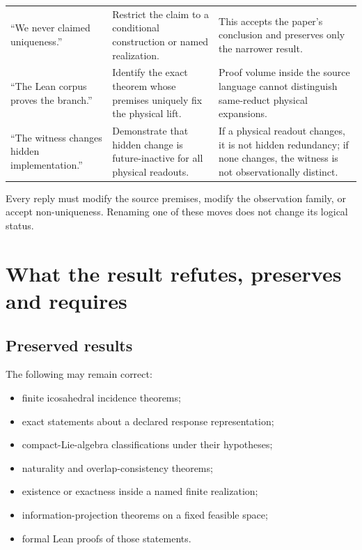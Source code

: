 \documentclass[10pt,a4paper]{article}
\theoremstyle{definition}
\theoremstyle{remark}
\begin{document}
\begin{longtable}{>{\raggedright\arraybackslash}p{}>{\raggedright\arraybackslash}p{}>{\raggedright\arraybackslash}p{}}
\addlinespace
``We never claimed uniqueness.'' & Restrict the claim to a conditional construction or named realization. & This accepts the paper's conclusion and preserves only the narrower result.\\
\addlinespace
``The Lean corpus proves the branch.'' & Identify the exact theorem whose premises uniquely fix the physical lift. & Proof volume inside the source language cannot distinguish same-reduct physical expansions.\\
\addlinespace
``The witness changes hidden implementation.'' & Demonstrate that hidden change is future-inactive for all physical readouts. & If a physical readout changes, it is not hidden redundancy; if none changes, the witness is not observationally distinct.\\
\bottomrule
\end{longtable}

\begin{warningbox}
Every reply must modify the source premises, modify the observation family, or
accept non-uniqueness.  Renaming one of these moves does not change its logical
status.
\end{warningbox}

\section{What the result refutes, preserves and requires}

\subsection{Preserved results}

The following may remain correct:

\begin{itemize}
\item finite icosahedral incidence theorems;
\item exact statements about a declared response representation;
\item compact-Lie-algebra classifications under their hypotheses;
\item naturality and overlap-consistency theorems;
\item existence or exactness inside a named finite realization;
\item information-projection theorems on a fixed feasible space;
\item formal Lean proofs of those statements.
\end{itemize}
\end{document}
